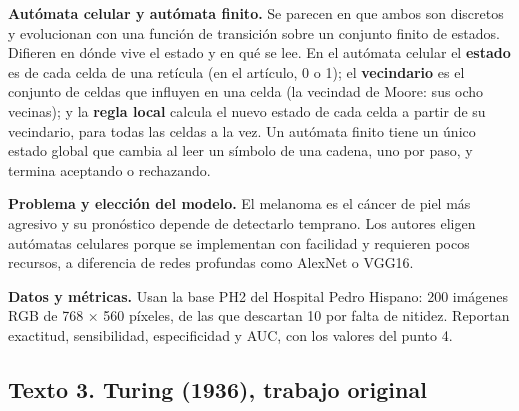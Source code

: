 \textbf{Autómata celular y autómata finito.} Se parecen en que ambos son discretos y evolucionan con una función de transición sobre un conjunto finito de estados. Difieren en dónde vive el estado y en qué se lee. En el autómata celular el \textbf{estado} es de cada celda de una retícula (en el artículo, 0 o 1); el \textbf{vecindario} es el conjunto de celdas que influyen en una celda (la vecindad de Moore: sus ocho vecinas); y la \textbf{regla local} calcula el nuevo estado de cada celda a partir de su vecindario, para todas las celdas a la vez. Un autómata finito tiene un único estado global que cambia al leer un símbolo de una cadena, uno por paso, y termina aceptando o rechazando.

\textbf{Problema y elección del modelo.} El melanoma es el cáncer de piel más agresivo y su pronóstico depende de detectarlo temprano. Los autores eligen autómatas celulares porque se implementan con facilidad y requieren pocos recursos, a diferencia de redes profundas como AlexNet o VGG16.

\textbf{Datos y métricas.} Usan la base PH2 del Hospital Pedro Hispano: 200 imágenes RGB de 768 × 560 píxeles, de las que descartan 10 por falta de nitidez. Reportan exactitud, sensibilidad, especificidad y AUC, con los valores del punto 4.

\hypertarget{texto-3.-turing-1936-trabajo-original}{%
\subsection{Texto 3. Turing (1936), trabajo original}\label{texto-3.-turing-1936-trabajo-original}}

